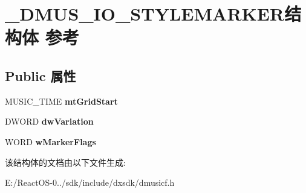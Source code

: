 \hypertarget{struct___d_m_u_s___i_o___s_t_y_l_e_m_a_r_k_e_r}{}\section{\+\_\+\+D\+M\+U\+S\+\_\+\+I\+O\+\_\+\+S\+T\+Y\+L\+E\+M\+A\+R\+K\+E\+R结构体 参考}
\label{struct___d_m_u_s___i_o___s_t_y_l_e_m_a_r_k_e_r}
\subsection*{Public 属性}
\begin{DoxyCompactItemize}
\item 
\mbox{\label{struct___d_m_u_s___i_o___s_t_y_l_e_m_a_r_k_e_r_acf84a9db24018c8b4e5fc79a098fd217}} 
M\+U\+S\+I\+C\+\_\+\+T\+I\+ME {\bfseries mt\+Grid\+Start}
\item 
\mbox{\label{struct___d_m_u_s___i_o___s_t_y_l_e_m_a_r_k_e_r_aa537813cf73e51653504bbe22004914c}} 
D\+W\+O\+RD {\bfseries dw\+Variation}
\item 
\mbox{\label{struct___d_m_u_s___i_o___s_t_y_l_e_m_a_r_k_e_r_a794e01f96ce3073a4b5c8be9ece0c1a7}} 
W\+O\+RD {\bfseries w\+Marker\+Flags}
\end{DoxyCompactItemize}


该结构体的文档由以下文件生成\+:\begin{DoxyCompactItemize}
\item 
E\+:/\+React\+O\+S-\/0../sdk/include/dxsdk/dmusicf.\+h\end{DoxyCompactItemize}
